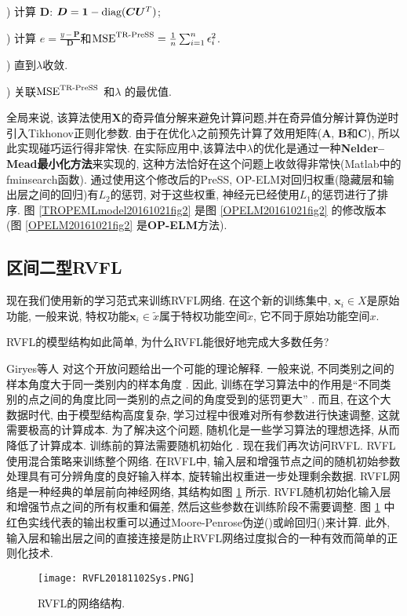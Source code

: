 ) 计算 $\bm D$: $\bm D = \bm 1-\textup{diag}(\bm C\bm U^T)$;

) 计算 $e = \frac{y-\bm P} {\bm D}$和$\textup{MSE}^{\textup{TR-PreSS}}=\frac 1 n \sum_{i=1}^n \epsilon_i^2$.

) 直到$\lambda$收敛.

) 关联$\textup{MSE}^{\textup{TR-PreSS}}$ 和$\lambda$ 的最优值.

全局来说, 该算法使用$\bm X$的奇异值分解来避免计算问题,并在奇异值分解计算伪逆时引入Tikhonov正则化参数.
由于在优化$\lambda$之前预先计算了效用矩阵($\bm A$, $\bm B$和$\bm C$), 所以此实现碰巧运行得非常快.
在实际应用中,该算法中$\lambda$的优化是通过一种\textbf{Nelder–Mead最小化方法}来实现的, 这种方法恰好在这个问题上收敛得非常快(Matlab中的fminsearch函数).
通过使用这个修改后的PreSS, OP-ELM对回归权重(隐藏层和输出层之间的回归)有$L_2$的惩罚, 对于这些权重, 神经元已经使用$L_1$的惩罚进行了排序.
图 \ref{TROPEMLmodel20161021fig2} 是图 \ref{OPELM20161021fig2} 的修改版本 (图 \ref{OPELM20161021fig2} 是\textbf{OP-ELM}方法).
\subsection{区间二型RVFL}
现在我们使用新的学习范式来训练RVFL网络.
在这个新的训练集中, $\bm x_i\in X$是原始功能, 一般来说, 特权功能$\bm x_i\in \widetilde x$属于特权功能空间$\widetilde x$, 它不同于原始功能空间$x$.

RVFL的模型结构如此简单, 为什么RVFL能很好地完成大多数任务?

Giryes等人 \cite{Giryes2016-7439822} 对这个开放问题给出一个可能的理论解释.
一般来说, 不同类别之间的样本角度大于同一类别内的样本角度 \cite{LiorWolf2003}.
因此, 训练在学习算法中的作用是“不同类别的点之间的角度比同一类别的点之间的角度受到的惩罚更大” \cite{Giryes2016-7439822}.
而且, 在这个大数据时代, 由于模型结构高度复杂, 学习过程中很难对所有参数进行快速调整, 这就需要极高的计算成本.
为了解决这个问题, 随机化是一些学习算法的理想选择, 从而降低了计算成本. 训练前的算法需要随机初始化  \cite{Glorot2015, Zhang2015}.
现在我们再次访问RVFL. RVFL使用混合策略来训练整个网络.
在RVFL中, 输入层和增强节点之间的随机初始参数处理具有可分辨角度的良好输入样本, 旋转输出权重进一步处理剩余数据.
RVFL网络是一种经典的单层前向神经网络, 其结构如图 \ref{RVFLNN181102Sys} 所示. RVFL随机初始化输入层和增强节点之间的所有权重和偏差, 然后这些参数在训练阶段不需要调整.
图 \ref{RVFLNN181102Sys} 中红色实线代表的输出权重可以通过Moore-Penrose伪逆(\cite{paopillips1995-6471,IgelnikPao1995-6470})或岭回归(\cite{Bishop2012-6469})来计算.
此外, 输入层和输出层之间的直接连接是防止RVFL网络过度拟合的一种有效而简单的正则化技术.
\begin{figure}[tb]
\centering
  \texttt{[image: RVFL20181102Sys.PNG]}
  \caption{RVFL的网络结构.}
  \label{RVFLNN181102Sys}
\end{figure}

